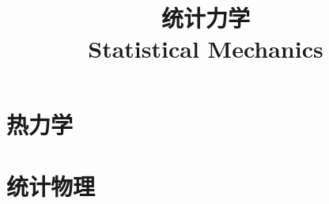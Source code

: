 \documentclass{../thunote}
\title{统计力学\\Statistical Mechanics}
\begin{document}
\maketitle

\frontmatter
\tableofcontents
\listoffigures

\mainmatter

\part{热力学}




\part{统计物理}






\end{document}
